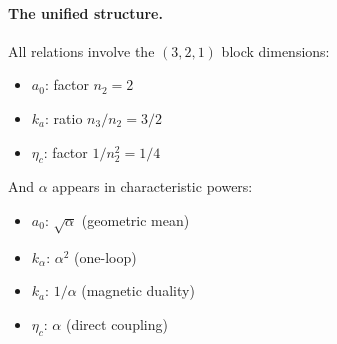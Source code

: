 \paragraph{The unified structure.}
All relations involve the $(3,2,1)$ block dimensions:
\begin{itemize}
\item $a_0$: factor $n_2 = 2$
\item $k_a$: ratio $n_3/n_2 = 3/2$
\item $\eta_c$: factor $1/n_2^2 = 1/4$
\end{itemize}

And $\alpha$ appears in characteristic powers:
\begin{itemize}
\item $a_0$: $\sqrt{\alpha}$ (geometric mean)
\item $k_\alpha$: $\alpha^2$ (one-loop)
\item $k_a$: $1/\alpha$ (magnetic duality)
\item $\eta_c$: $\alpha$ (direct coupling)
\end{itemize}

